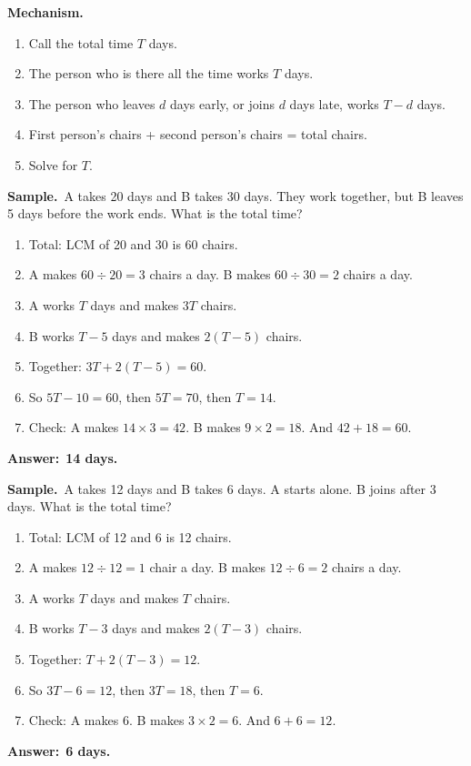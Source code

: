 \documentclass[11pt,a4paper]{article}
\newcommand{\mech}{\textbf{\color{ember}Mechanism.}\ }
\newif\ifkeepsamp
\newcommand{\ans}[1]{\par\nopagebreak\noindent\textbf{\color{ember}Answer:}\ \textbf{#1}\par}
\newcommand{\samp}{\ifkeepsamp\needspace{4\baselineskip}\fi\textbf{\color{ember}Sample.}\ }
\begin{document}
\mech
\begin{enumerate}
\item Call the total time $T$ days.
\item The person who is there all the time works $T$ days.
\item The person who leaves $d$ days early, or joins $d$ days late, works $T - d$ days.
\item First person's chairs + second person's chairs = total chairs.
\item Solve for $T$.
\end{enumerate}

\begin{center}
\end{center}

\samp A takes 20 days and B takes 30 days. They work together, but B leaves 5 days before the work ends. What is the total time?
\begin{enumerate}
\item Total: LCM of 20 and 30 is 60 chairs.
\item A makes $60 \div 20 = 3$ chairs a day. B makes $60 \div 30 = 2$ chairs a day.
\item A works $T$ days and makes $3T$ chairs.
\item B works $T - 5$ days and makes $2(T - 5)$ chairs.
\item Together: $3T + 2(T - 5) = 60$.
\item So $5T - 10 = 60$, then $5T = 70$, then $T = 14$.
\item Check: A makes $14 \times 3 = 42$. B makes $9 \times 2 = 18$. And $42 + 18 = 60$.
\end{enumerate}
\ans{14 days.}

\samp A takes 12 days and B takes 6 days. A starts alone. B joins after 3 days. What is the total time?
\begin{enumerate}
\item Total: LCM of 12 and 6 is 12 chairs.
\item A makes $12 \div 12 = 1$ chair a day. B makes $12 \div 6 = 2$ chairs a day.
\item A works $T$ days and makes $T$ chairs.
\item B works $T - 3$ days and makes $2(T - 3)$ chairs.
\item Together: $T + 2(T - 3) = 12$.
\item So $3T - 6 = 12$, then $3T = 18$, then $T = 6$.
\item Check: A makes 6. B makes $3 \times 2 = 6$. And $6 + 6 = 12$.
\end{enumerate}
\ans{6 days.}
\end{document}
